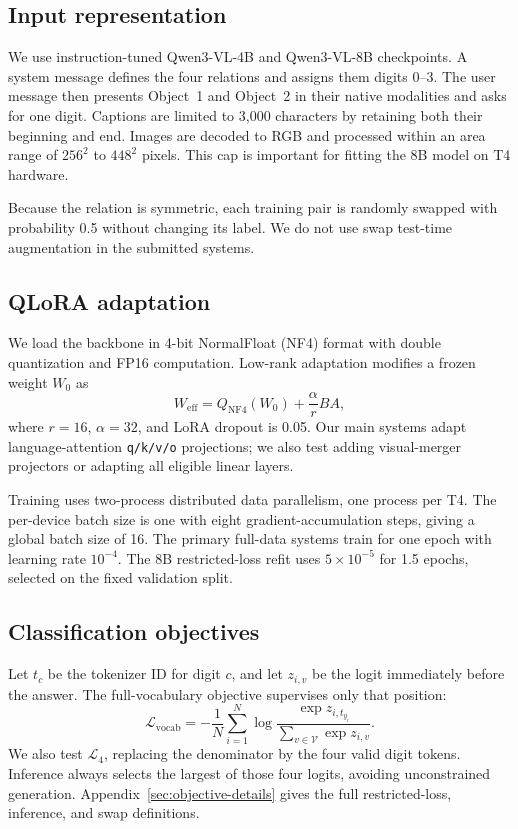 \documentclass[11pt]{article}
\begin{document}
\subsection{Input representation}

We use instruction-tuned Qwen3-VL-4B and Qwen3-VL-8B checkpoints.  A system message defines the four relations and assigns them digits 0--3.  The user message then presents Object~1 and Object~2 in their native modalities and asks for one digit.  Captions are limited to 3,000 characters by retaining both their beginning and end.  Images are decoded to RGB and processed within an area range of $256^2$ to $448^2$ pixels.  This cap is important for fitting the 8B model on T4 hardware.

Because the relation is symmetric, each training pair is randomly swapped with probability 0.5 without changing its label.  We do not use swap test-time augmentation in the submitted systems.

\subsection{QLoRA adaptation}

We load the backbone in 4-bit NormalFloat (NF4) format with double quantization and FP16 computation.  Low-rank adaptation \citep{hu2022lora} modifies a frozen weight $W_0$ as
\begin{equation}
W_{\mathrm{eff}}=Q_{\mathrm{NF4}}(W_0)+\frac{\alpha}{r}BA,
\end{equation}
where $r=16$, $\alpha=32$, and LoRA dropout is 0.05.  Our main systems adapt language-attention \texttt{q/k/v/o} projections; we also test adding visual-merger projectors or adapting all eligible linear layers.

Training uses two-process distributed data parallelism, one process per T4.  The per-device batch size is one with eight gradient-accumulation steps, giving a global batch size of 16.  The primary full-data systems train for one epoch with learning rate $10^{-4}$.  The 8B restricted-loss refit uses $5\times10^{-5}$ for 1.5 epochs, selected on the fixed validation split.

\subsection{Classification objectives}

Let $t_c$ be the tokenizer ID for digit $c$, and let $z_{i,v}$ be the logit immediately before the answer.  The full-vocabulary objective supervises only that position:
\begin{equation}
\mathcal{L}_{\mathrm{vocab}}=-\frac{1}{N}\sum_{i=1}^{N}
\log\frac{\exp z_{i,t_{y_i}}}{\sum_{v\in\mathcal{V}}\exp z_{i,v}}.
\end{equation}
We also test $\mathcal{L}_4$, replacing the denominator by the four valid digit tokens.  Inference always selects the largest of those four logits, avoiding unconstrained generation.  Appendix~\ref{sec:objective-details} gives the full restricted-loss, inference, and swap definitions.
\end{document}
